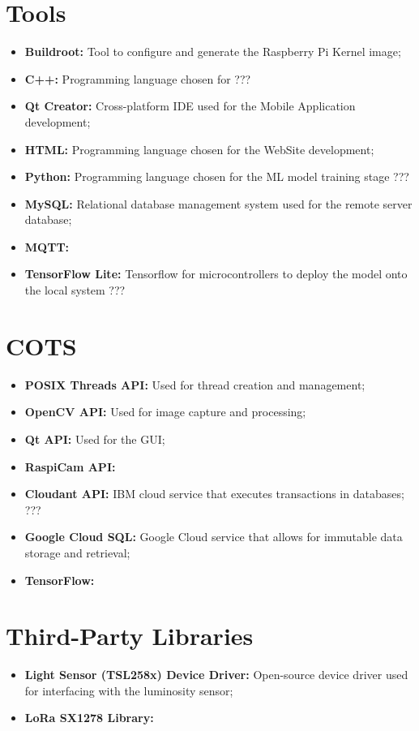 \section{Tools}

\begin{itemize}
	\item \textbf{Buildroot: } Tool to configure and generate the Raspberry Pi Kernel image;
	\item \textbf{C++: } Programming language chosen for ???
	\item \textbf{Qt Creator: } Cross-platform IDE used for the Mobile Application development;
	\item \textbf{HTML: } Programming language chosen for the WebSite development;
	\item \textbf{Python: } Programming language chosen for the ML model training stage ???
	\item \textbf{MySQL: } Relational database management system used for the remote server database;
	\item \textbf{MQTT: }
	\item \textbf{TensorFlow Lite: } Tensorflow for microcontrollers to deploy the model onto the local system ???
\end{itemize}

\section{COTS}

\begin{itemize}
	\item \textbf{POSIX Threads API: } Used for thread creation and management;
	\item \textbf{OpenCV API: } Used for image capture and processing;
	\item \textbf{Qt API: } Used for the GUI;
	\item \textbf{RaspiCam API: } 
	\item \textbf{Cloudant API: } IBM cloud service that executes transactions in databases; ???
	\item \textbf{Google Cloud SQL: } Google Cloud service that allows for immutable data storage and retrieval;
	\item \textbf{TensorFlow: }
\end{itemize}

\section{Third-Party Libraries}

\begin{itemize}
	\item \textbf{Light Sensor (TSL258x) Device Driver: } Open-source device driver used for interfacing with the luminosity sensor;
	\item \textbf{LoRa SX1278 Library: }
\end{itemize}
